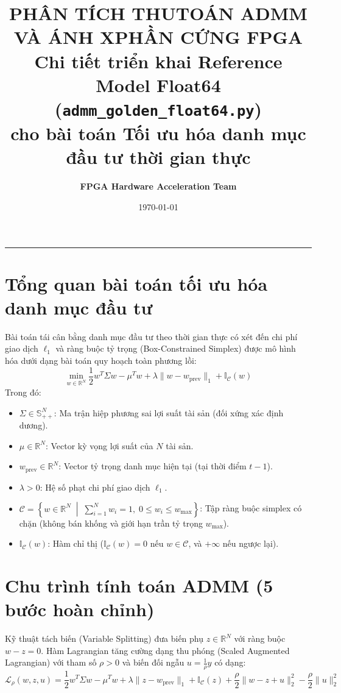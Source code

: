 \documentclass[12pt,a4paper]{article}
\title{\textbf{PH\^AN T\'ICH THU\ẬT TO\'AN ADMM V\`A \'ANH X\Ạ PHẦN CỨNG FPGA}\\[0.5em]
\large Chi tiết triển khai Reference Model Float64 (\texttt{admm\_golden\_float64.py})\\cho bài toán Tối ưu hóa danh mục đầu tư thời gian thực}
\author{\textbf{FPGA Hardware Acceleration Team}}
\date{\today}
\begin{document}
\maketitle

\hrule
\vspace{1em}

\section{Tổng quan bài toán tối ưu hóa danh mục đầu tư}

Bài toán tái cân bằng danh mục đầu tư theo thời gian thực có xét đến chi phí giao dịch $\ell_1$ và ràng buộc tỷ trọng (Box-Constrained Simplex) được mô hình hóa dưới dạng bài toán quy hoạch toàn phương lồi:
\begin{equation}
\min_{w \in \mathbb{R}^N} \frac{1}{2} w^T \Sigma w - \mu^T w + \lambda \|w - w_{\text{prev}}\|_1 + \mathbb{I}_{\mathcal{C}}(w)
\end{equation}
Trong đó:
\begin{itemize}[leftmargin=1.5em]
    \item $\Sigma \in \mathbb{S}_{++}^N$: Ma trận hiệp phương sai lợi suất tài sản (đối xứng xác định dương).
    \item $\mu \in \mathbb{R}^N$: Vector kỳ vọng lợi suất của $N$ tài sản.
    \item $w_{\text{prev}} \in \mathbb{R}^N$: Vector tỷ trọng danh mục hiện tại (tại thời điểm $t-1$).
    \item $\lambda > 0$: Hệ số phạt chi phí giao dịch $\ell_1$.
    \item $\mathcal{C} = \left\{ w \in \mathbb{R}^N \;\middle|\; \sum_{i=1}^N w_i = 1, \; 0 \le w_i \le w_{\max} \right\}$: Tập ràng buộc simplex có chặn (không bán khống và giới hạn trần tỷ trọng $w_{\max}$).
    \item $\mathbb{I}_{\mathcal{C}}(w)$: Hàm chỉ thị ($\mathbb{I}_{\mathcal{C}}(w) = 0$ nếu $w \in \mathcal{C}$, và $+\infty$ nếu ngược lại).
\end{itemize}

\section{Chu trình tính toán ADMM (5 bước hoàn chỉnh)}

Kỹ thuật tách biến (Variable Splitting) đưa biến phụ $z \in \mathbb{R}^N$ với ràng buộc $w - z = 0$. Hàm Lagrangian tăng cường dạng thu phóng (Scaled Augmented Lagrangian) với tham số $\rho > 0$ và biến đối ngẫu $u = \frac{1}{\rho} y$ có dạng:
\begin{equation}
\mathcal{L}_\rho(w, z, u) = \frac{1}{2} w^T \Sigma w - \mu^T w + \lambda \|z - w_{\text{prev}}\|_1 + \mathbb{I}_{\mathcal{C}}(z) + \frac{\rho}{2} \|w - z + u\|_2^2 - \frac{\rho}{2} \|u\|_2^2
\end{equation}
\end{document}
